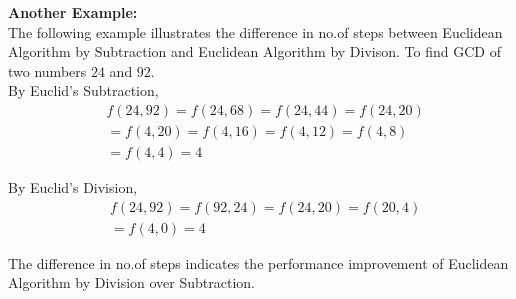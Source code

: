 \documentclass[journal,12pt,twocolumn]{IEEEtran}
\begin{document}
\textbf{Another Example:}\\
The following example illustrates the difference in no.of steps between Euclidean Algorithm by Subtraction and Euclidean Algorithm by Divison. To find GCD of two numbers $24$ and $92$.\\

By Euclid's Subtraction,
\[
\begin{split}
&f(24,92) = f(24,68) = f(24,44) = f(24,20)\\
&= f(4,20) = f(4,16) = f(4,12) = f(4,8)\\
&= f(4,4) = 4
\end{split}\]

By Euclid's Division,
\[
\begin{split}
&f(24,92) = f(92,24) = f(24,20) = f(20,4)\\
&= f(4,0) = 4
\end{split}\]

The difference in no.of steps indicates the performance improvement of Euclidean Algorithm by Division over Subtraction.
\end{document}
